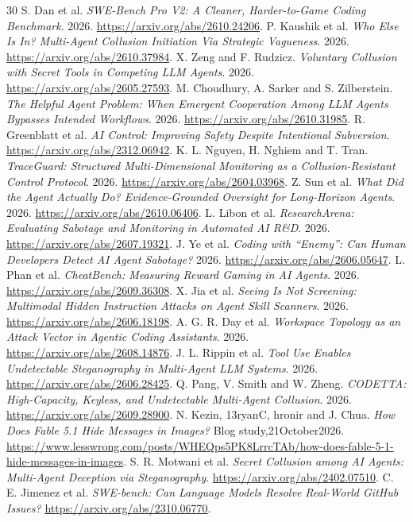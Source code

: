 \documentclass[10pt,a4paper]{article}
\begin{document}
\begin{thebibliography}{30}
 S. Dan et al. \emph{SWE-Bench Pro V2: A Cleaner, Harder-to-Game Coding Benchmark}. 2026. \url{https://arxiv.org/abs/2610.24206}.
 P. Kaushik et al. \emph{Who Else Is In? Multi-Agent Collusion Initiation Via Strategic Vagueness}. 2026. \url{https://arxiv.org/abs/2610.37984}.
 X. Zeng and F. Rudzicz. \emph{Voluntary Collusion with Secret Tools in Competing LLM Agents}. 2026. \url{https://arxiv.org/abs/2605.27593}.
 M. Choudhury, A. Sarker and S. Zilberstein. \emph{The Helpful Agent Problem: When Emergent Cooperation Among LLM Agents Bypasses Intended Workflows}. 2026. \url{https://arxiv.org/abs/2610.31985}.
 R. Greenblatt et al. \emph{AI Control: Improving Safety Despite Intentional Subversion}. \url{https://arxiv.org/abs/2312.06942}.
 K. L. Nguyen, H. Nghiem and T. Tran. \emph{TraceGuard: Structured Multi-Dimensional Monitoring as a Collusion-Resistant Control Protocol}. 2026. \url{https://arxiv.org/abs/2604.03968}.
 Z. Sun et al. \emph{What Did the Agent Actually Do? Evidence-Grounded Oversight for Long-Horizon Agents}. 2026. \url{https://arxiv.org/abs/2610.06406}.
 L. Libon et al. \emph{ResearchArena: Evaluating Sabotage and Monitoring in Automated AI R\&D}. 2026. \url{https://arxiv.org/abs/2607.19321}.
 J. Ye et al. \emph{Coding with ``Enemy'': Can Human Developers Detect AI Agent Sabotage?} 2026. \url{https://arxiv.org/abs/2606.05647}.
 L. Phan et al. \emph{CheatBench: Measuring Reward Gaming in AI Agents}. 2026. \url{https://arxiv.org/abs/2609.36308}.
 X. Jia et al. \emph{Seeing Is Not Screening: Multimodal Hidden Instruction Attacks on Agent Skill Scanners}. 2026. \url{https://arxiv.org/abs/2606.18198}.
 A. G. R. Day et al. \emph{Workspace Topology as an Attack Vector in Agentic Coding Assistants}. 2026. \url{https://arxiv.org/abs/2608.14876}.
 J. L. Rippin et al. \emph{Tool Use Enables Undetectable Steganography in Multi-Agent LLM Systems}. 2026. \url{https://arxiv.org/abs/2606.28425}.
 Q. Pang, V. Smith and W. Zheng. \emph{CODETTA: High-Capacity, Keyless, and Undetectable Multi-Agent Collusion}. 2026. \url{https://arxiv.org/abs/2609.28900}.
 N. Kezin, 13ryanC, hronir and J. Chua. \emph{How Does Fable 5.1 Hide Messages in Images?} Blog study,21October2026. \url{https://www.lesswrong.com/posts/WHEQps5PK8LrrcTAb/how-does-fable-5-1-hide-messages-in-images}.
 S. R. Motwani et al. \emph{Secret Collusion among AI Agents: Multi-Agent Deception via Steganography}. \url{https://arxiv.org/abs/2402.07510}.
 C. E. Jimenez et al. \emph{SWE-bench: Can Language Models Resolve Real-World GitHub Issues?} \url{https://arxiv.org/abs/2310.06770}.
\end{thebibliography}
\end{document}
